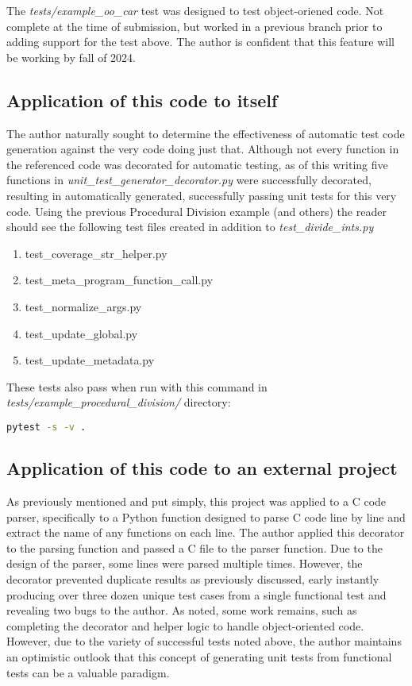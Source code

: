 The \textit{tests/example\_oo\_car} test was designed to test
object-oriened code. Not complete at the time of submission, but worked in a 
previous branch prior to adding support for the test above.
The author is confident that this feature will be working by 
fall of 2024.
%
\subsection{Application of this code to itself}\label{sec:eval-2}

The author naturally sought to determine the effectiveness of automatic
test code generation against the very code doing just that.  Although not 
every function in the referenced code was decorated for automatic testing, 
as of this writing five functions in 
\textit{unit\_test\_generator\_decorator.py} were successfully decorated, 
resulting in automatically generated, successfully passing unit tests for this
very code.  Using the previous Procedural Division example (and others) 
the reader should see the following test files created in addition to 
\textit{test\_divide\_ints.py}

\begin{enumerate}
    \item test\_coverage\_str\_helper.py
    \item test\_meta\_program\_function\_call.py
    \item test\_normalize\_args.py
    \item test\_update\_global.py
    \item test\_update\_metadata.py
\end{enumerate}

These tests also pass when run with this command in 
\linebreak
\textit{tests/example\_procedural\_division/} directory:
\begin{lstlisting}[language=bash, caption={Running all generated unit
   tests for the division example}]
    pytest -s -v .
\end{lstlisting}

\subsection{Application of this code to an external project}\label{sec:eval-2}
As previously mentioned and put simply, this project was applied to a C code parser, 
specifically to a Python function designed to parse C code line by line
and extract the name of any functions on each line.  The author applied this
decorator to the parsing function and passed a C file to the parser function.
%
Due to the design of the parser, some lines were parsed multiple times.  
However, the decorator prevented duplicate results as previously discussed, 
early instantly producing over three dozen unique test cases 
from a single functional test and revealing two bugs to the author.
%
As noted, some work remains, such as completing the decorator and helper logic
to handle object-oriented code.  However, due to the variety of successful 
tests noted above, the author maintains an optimistic outlook that this concept
of generating unit tests from functional tests can be a valuable paradigm.

